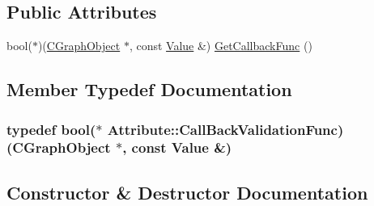 \subsection*{Public Attributes}
\begin{DoxyCompactItemize}
\item 
bool($\ast$)(\hyperlink{class_c_graph_object}{C\+Graph\+Object} $\ast$, const \hyperlink{class_value}{Value} \&) \hyperlink{class_attribute_aaf3df82a60913bfb62179764f2f2cc73}{Get\+Callback\+Func} ()
\end{DoxyCompactItemize}


\subsection{Member Typedef Documentation}
\hypertarget{class_attribute_a55241f36afbe917f6e57c0c8c01bd287}{}
\subsubsection[{Call\+Back\+Validation\+Func}]{\setlength{\rightskip}{0pt plus 5cm}typedef bool($\ast$ Attribute\+::\+Call\+Back\+Validation\+Func) ({\bf C\+Graph\+Object} $\ast$, const {\bf Value} \&)}\label{class_attribute_a55241f36afbe917f6e57c0c8c01bd287}


\subsection{Constructor \& Destructor Documentation}
\hypertarget{class_attribute_a37f1e806f6804ec9c2c48ec61186260a}{}
